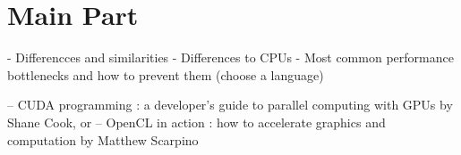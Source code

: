 \section{Main Part}

- Differencces and similarities
- Differences to CPUs
- Most common performance bottlenecks and how to prevent them (choose a language)

– CUDA programming : a developer's guide to parallel computing with GPUs by Shane
Cook, or
– OpenCL in action : how to accelerate graphics and computation by Matthew
Scarpino